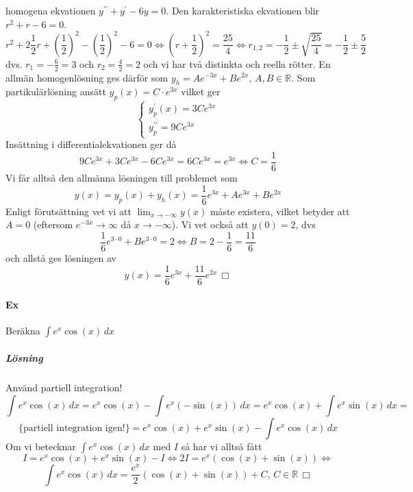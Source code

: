 homogena ekvationen $y^{\prime\prime}+y^\prime-6y=0$.
Den karakteristiska ekvationen blir $r^2+r-6=0$.
\begin{equation*}
    r^2+2\frac{1}{2}r+(\frac{1}{2})^2-(\frac{1}{2})^2-6=0 \Leftrightarrow
    (r+\frac{1}{2})^2=\frac{25}{4}\Leftrightarrow
    r_{1,2}=-\frac{1}{2}\pm\sqrt{\frac{25}{4}}=-\frac{1}{2}\pm \frac{5}{2}
\end{equation*}
dvs. $r_1=-\frac{6}{2}=3$ och $r_2=\frac{4}{2}=2$ och vi har två distinkta och reella rötter.
En allmän homogenlösning ges därför som $y_h=Ae^{-3x}+Be^{2x},\, A,B\in\mathbb{R}$.
Som partikulärlösning ansätt $y_p(x)=C\cdot e^{3x}$ vilket ger
\begin{equation*}
    \left\lbrace
    \begin{matrix}
        y_p^\prime(x)=3Ce^{3x} \\
        y_p^{\prime\prime}=9Ce^{3x}
    \end{matrix}
    \right.
\end{equation*}
Insättning i differentialekvationen ger då
\begin{equation*}
    9Ce^{3x}+3Ce^{3x}-6Ce^{3x}=6Ce^{3x}=e^{3x}\Leftrightarrow C=\frac{1}{6}
\end{equation*}
Vi får alltså den allmänna lösningen till problemet som
\begin{equation*}
    y(x)=y_p(x)+y_h(x)=\frac{1}{6}e^{3x}+Ae^{3x}+Be^{2x}
\end{equation*}
Enligt förutsättning vet vi att $\lim_{x\to-\infty}y(x)$ måste existera, vilket betyder att $A=0$ (eftersom $e^{-3x}\to\infty$ då $x\to-\infty$).
Vi vet också att $y(0)=2$, dvs
\begin{equation*}
    \frac{1}{6}e^{3\cdot 0}+Be^{3\cdot 0}=2\Leftrightarrow
    B=2-\frac{1}{6}=\frac{11}{6}
\end{equation*}
och allstå ges lösningen av
\begin{equation*}
    y(x)=\frac{1}{6}e^{3x}+\frac{11}{6}e^{2x}\, \Box
\end{equation*}

\paragraph*{Ex} Beräkna $\int e^x\cos(x)\, dx$
\subparagraph*{Lösning}
Använd partiell integration!
\begin{equation*}
    \int e^x\cos(x)\, dx=
    e^x\cos(x)-\int e^x(-\sin(x))\, dx=
    e^x\cos(x)+\int e^x\sin(x)\, dx=
\end{equation*}
\begin{equation*}
    \{\text{partiell integration igen!}\}=
    e^x\cos(x)+e^x\sin(x)-\int e^x\cos(x)\, dx
\end{equation*}
Om vi betecknar $\int e^x\cos(x)\, dx$ med $I$ så har vi alltså fått
\begin{equation*}
    I=e^x\cos(x)+e^x\sin(x)-I\Leftrightarrow
    2I=e^x(\cos(x)+\sin(x))\Leftrightarrow
\end{equation*}
\begin{equation*}
    \int e^x\cos(x)\, dx=
    \frac{e^x}{2}(\cos(x)+\sin(x))+C,\,C\in\mathbb{R}\, \Box
\end{equation*}

